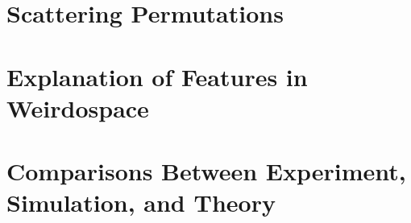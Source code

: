 \documentclass[a4paper]{article}
\begin{document}
\section{Scattering Permutations}
\label{sec:permute}

\section{Explanation of Features in Weirdospace}
\label{sec:explain}

\section{Comparisons Between Experiment, Simulation, and Theory}




%
%
\end{document}

